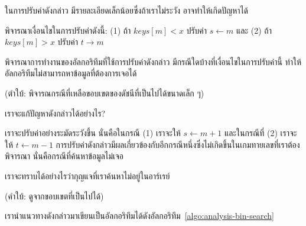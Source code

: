 ใน{\wbr}การ{\wbr}ปรับ{\wbr}ค่า{\wbr}ดังกล่าว{\wbr}
มี{\wbr}รายละเอียด{\wbr}เล็กน้อย{\wbr}ซึ่ง{\wbr}ถ้า{\wbr}เรา{\wbr}ไม่{\wbr}ระวัง อาจ{\wbr}ทำ{\wbr}ให้{\wbr}เกิด{\wbr}ปัญหา{\wbr}ได้{\wbr}

\begin{quiz}{พิจารณา{\wbr}เงื่อนไข{\wbr}ใน{\wbr}การ{\wbr}ปรับ{\wbr}ค่า{\wbr}ดังนี้: (1) ถ้า $keys[m] < x$ ปรับ{\wbr}ค่า $s\leftarrow m$ และ (2)}
ถ้า $keys[m] > x$ ปรับ{\wbr}ค่า $t\rightarrow m$  

พิจารณา{\wbr}การ{\wbr}ทำงาน{\wbr}ของ{\wbr}อัล{\wbr}กอ{\wbr}ริ{\wbr}ทึม{\wbr}ที่{\wbr}ใช้{\wbr}การ{\wbr}ปรับ{\wbr}ค่า{\wbr}ดังกล่าว มี{\wbr}กรณี{\wbr}ใด{\wbr}บ้าง{\wbr}ที่{\wbr}เงื่อนไข{\wbr}ใน{\wbr}การ{\wbr}ปรับ{\wbr}ค่า{\wbr}นี้{\wbr}
ทำ{\wbr}ให้{\wbr}อัล{\wbr}กอ{\wbr}ริ{\wbr}ทึม{\wbr}ไม่{\wbr}สามารถ{\wbr}หา{\wbr}ข้อมูล{\wbr}ที่{\wbr}ต้องการ{\wbr}เจอ{\wbr}ได้{\wbr}

(ตำ{\wbr}ใบ้: พิจารณกรณี{\wbr}ที่{\wbr}เหลือ{\wbr}ขอบเขต{\wbr}ของ{\wbr}ดัชนี{\wbr}ที่{\wbr}เป็น{\wbr}ไป{\wbr}ได้{\wbr}ขนาด{\wbr}เล็ก ๆ)
\end{quiz}

\begin{quiz}{}
เรา{\wbr}จะ{\wbr}แก้{\wbr}ปัญหา{\wbr}ดังกล่าว{\wbr}ได้{\wbr}อย่างไร?
\end{quiz}

เรา{\wbr}จะ{\wbr}ปรับ{\wbr}ค่า{\wbr}อย่าง{\wbr}ระมัดระวัง{\wbr}ขึ้น นั่น{\wbr}คือ{\wbr}ใน{\wbr}กรณี (1) เรา{\wbr}จะ{\wbr}ให้ $s\leftarrow m+1$
และ{\wbr}ใน{\wbr}กรณี{\wbr}ที่ (2) เรา{\wbr}จะ{\wbr}ให้ $t\leftarrow m-1$
การ{\wbr}ปรับ{\wbr}ค่า{\wbr}ดังกล่าว{\wbr}มี{\wbr}ผล{\wbr}เกี่ยวข้อง{\wbr}กับ{\wbr}อีก{\wbr}กรณี{\wbr}หนึ่ง{\wbr}ซึ่ง{\wbr}ไม่{\wbr}เกิด{\wbr}ขึ้น{\wbr}ใน{\wbr}เกม{\wbr}ทาย{\wbr}เลขที่{\wbr}เรา{\wbr}ต้อง{\wbr}พิจารณา{\wbr}
นั่น{\wbr}คือ{\wbr}กรณี{\wbr}ที่{\wbr}ค้นหา{\wbr}ข้อมูล{\wbr}ไม่{\wbr}เจอ{\wbr}

\begin{quiz}{}
เรา{\wbr}จะ{\wbr}ทราบ{\wbr}ได้{\wbr}อย่างไร{\wbr}ว่า{\wbr}กุญแจ{\wbr}ที่{\wbr}เรา{\wbr}ค้นหา{\wbr}ไม่{\wbr}อยู่{\wbr}ใน{\wbr}อาร์เรย์

(คำ{\wbr}ใบ้: ดู{\wbr}จาก{\wbr}ขอบเขต{\wbr}ที่{\wbr}เป็น{\wbr}ไป{\wbr}ได้)
\end{quiz}

เรา{\wbr}นำ{\wbr}แนวทาง{\wbr}ดังกล่าว{\wbr}มา{\wbr}เขียน{\wbr}เป็น{\wbr}อัล{\wbr}กอ{\wbr}ริ{\wbr}ทึม{\wbr}ได้{\wbr}ดัง{\wbr}อัล{\wbr}กอ{\wbr}ริ{\wbr}ทึม~\ref{algo:analysis-bin-search}

